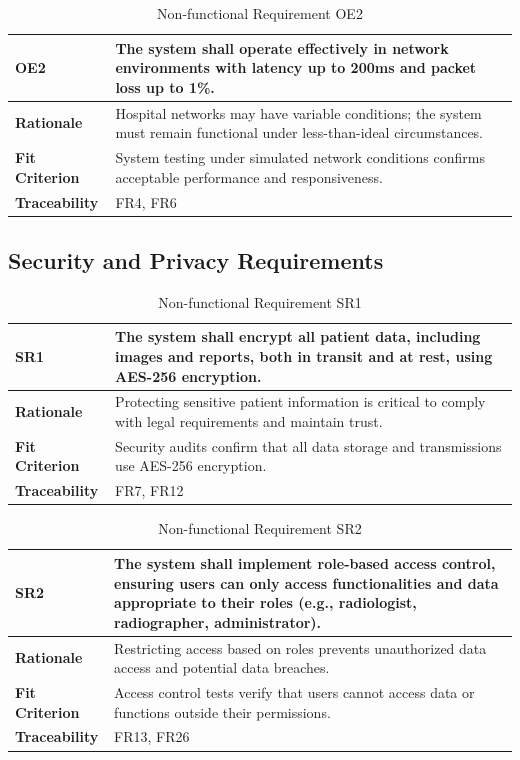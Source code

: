 \documentclass[12pt]{article}
\begin{document}
\begin{table}[h!]
\centering
{}
\begin{tabular}{|p{3.5cm}|p{11.5cm}|}
\hline
\rowcolor{gray!30}
\textbf{OE2} & The system shall operate effectively in network environments with latency up to 200ms and packet loss up to 1\%. \\
\hline
\textbf{Rationale} & Hospital networks may have variable conditions; the system must remain functional under less-than-ideal circumstances. \\
\hline
\textbf{Fit Criterion} & System testing under simulated network conditions confirms acceptable performance and responsiveness. \\
\hline
\textbf{Traceability} & FR4, FR6 \\
\hline
\end{tabular}
\caption{Non-functional Requirement OE2}
\end{table}
\clearpage
\subsection{Security and Privacy Requirements}

\begin{table}[h!]
\centering
{}
\begin{tabular}{|p{3.5cm}|p{11.5cm}|}
\hline
\rowcolor{gray!30}
\textbf{SR1} & The system shall encrypt all patient data, including images and reports, both in transit and at rest, using AES-256 encryption. \\
\hline
\textbf{Rationale} & Protecting sensitive patient information is critical to comply with legal requirements and maintain trust. \\
\hline
\textbf{Fit Criterion} & Security audits confirm that all data storage and transmissions use AES-256 encryption. \\
\hline
\textbf{Traceability} & FR7, FR12 \\
\hline
\end{tabular}
\caption{Non-functional Requirement SR1}
\end{table}

\begin{table}[h!]
\centering
{}
\begin{tabular}{|p{3.5cm}|p{11.5cm}|}
\hline
\rowcolor{gray!30}
\textbf{SR2} & The system shall implement role-based access control, ensuring users can only access functionalities and data appropriate to their roles (e.g., radiologist, radiographer, administrator). \\
\hline
\textbf{Rationale} & Restricting access based on roles prevents unauthorized data access and potential data breaches. \\
\hline
\textbf{Fit Criterion} & Access control tests verify that users cannot access data or functions outside their permissions. \\
\hline
\textbf{Traceability} & FR13, FR26 \\
\hline
\end{tabular}
\caption{Non-functional Requirement SR2}
\end{table}
\clearpage
\end{document}
